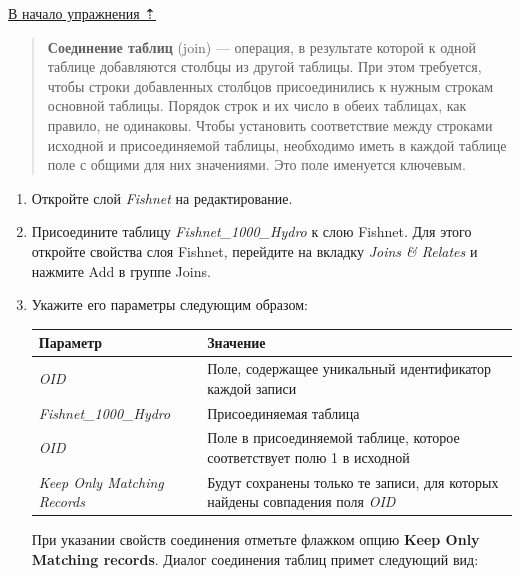 \documentclass[12pt,]{book}
\begin{document}
\protect\hyperlink{land-cover-hydro}{В начало упражнения ⇡}

\begin{quote}
\textbf{Соединение таблиц} (join) --- операция, в результате которой к одной таблице добавляются столбцы из другой таблицы. При этом требуется, чтобы строки добавленных столбцов присоединились к нужным строкам основной таблицы. Порядок строк и их число в обеих таблицах, как правило, не одинаковы. Чтобы установить соответствие между строками исходной и присоединяемой таблицы, необходимо иметь в каждой таблице поле с общими для них значениями. Это поле именуется ключевым.
\end{quote}

\begin{enumerate}
\def\labelenumi{\arabic{enumi}.}
\item
  Откройте слой \emph{Fishnet} на редактирование.
\item
  Присоедините таблицу \emph{Fishnet\_1000\_Hydro} к слою Fishnet. Для этого откройте свойства слоя Fishnet, перейдите на вкладку \emph{Joins \& Relates} и нажмите Add в группе Joins.
\item
  Укажите его параметры следующим образом:

  \begin{longtable}[]{@{}ll@{}}
  \toprule
  Параметр & Значение\tabularnewline
  \midrule
  \endhead
  \emph{OID} & Поле, содержащее уникальный идентификатор каждой записи\tabularnewline
  \emph{Fishnet\_1000\_Hydro} & Присоединяемая таблица\tabularnewline
  \emph{OID} & Поле в присоединяемой таблице, которое соответствует полю 1 в исходной\tabularnewline
  \emph{Keep Only Matching Records} & Будут сохранены только те записи, для которых найдены совпадения поля \emph{OID}\tabularnewline
  \bottomrule
  \end{longtable}

  При указании свойств соединения отметьте флажком опцию \textbf{Keep Only Matching records}. Диалог соединения таблиц примет следующий вид:


\end{enumerate}
\end{document}
